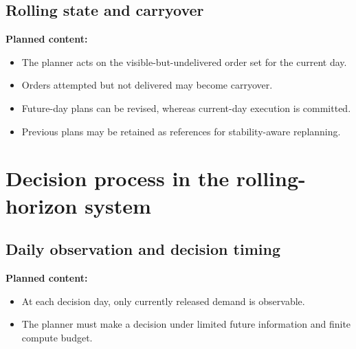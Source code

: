 \subsection{Rolling state and carryover}
\label{subsec:chapter03_rolling_state_and_carryover}

%

\noindent\textbf{Planned content:}
\begin{itemize}
    \item The planner acts on the visible-but-undelivered order set for the current day.
    \item Orders attempted but not delivered may become carryover.
    \item Future-day plans can be revised, whereas current-day execution is committed.
    \item Previous plans may be retained as references for stability-aware replanning.
\end{itemize}

\section{Decision process in the rolling-horizon system}
\label{sec:chapter03_decision_process}

%

\subsection{Daily observation and decision timing}
\label{subsec:chapter03_daily_observation}


\noindent\textbf{Planned content:}
\begin{itemize}
    \item At each decision day, only currently released demand is observable.
    \item The planner must make a decision under limited future information and finite compute budget.
\end{itemize}

